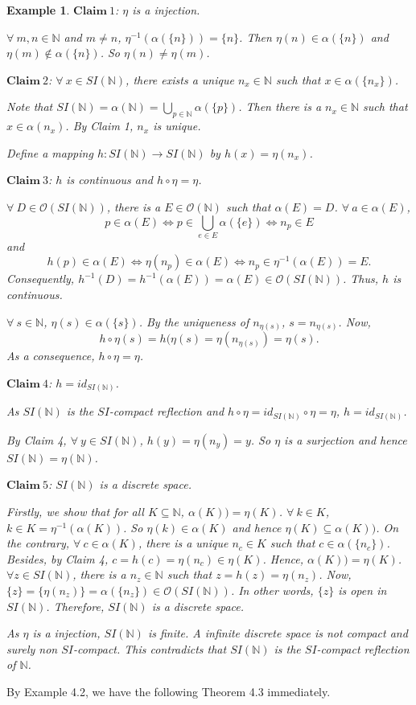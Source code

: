 \documentclass[preprint,12pt]{elsarticle}
\numberwithin{equation}{section}
\newtheorem{example}[theorem]{Example}
\begin{document}
\begin{example}
{$\mathbf{Claim} \ 1$: $\eta$ is a injection.

$\forall\ m,n\in\mathbb{\mathbb{N}}$ and $m\neq n$, $\eta^{-1}(\alpha(\{n\}))=\{n\}$. Then $\eta(n)\in\alpha(\{n\})$ and $\eta(m)\not\in\alpha(\{n\})$. So $\eta(n)\neq\eta(m)$.

$\mathbf{Claim} \ 2$: $\forall\ x\in SI(\mathbb{N})$, there exists a unique $n_{x}\in\mathbb{N}$ such that $x\in\alpha(\{n_{x}\})$.

Note that $SI(\mathbb{N})=\alpha(\mathbb{N})=\bigcup\limits_{p\in\mathbb{N}}\alpha(\{p\})$. Then there is a $n_{x}\in\mathbb{N}$ such that $x\in\alpha(n_{x})$. By Claim 1, $n_{x}$ is unique.

Define a mapping $h:SI(\mathbb{N})\longrightarrow SI(\mathbb{N})$ by $h(x)=\eta(n_{x})$.

$\mathbf{Claim} \ 3$: $h$ is continuous and $h\circ\eta=\eta$.

$\forall\ D\in\mathcal{O}(SI(\mathbb{N}))$, there is a $E\in\mathcal{O}(\mathbb{N})$ such that $\alpha(E)=D$. $\forall\ a\in\alpha(E)$,
$$p\in\alpha(E)\Longleftrightarrow p\in\bigcup\limits_{e\in E}\alpha(\{e\})\Longleftrightarrow n_{p}\in E$$ and
$$h(p)\in\alpha(E)\Longleftrightarrow\eta(n_{p})\in\alpha(E)\Longleftrightarrow n_{p}\in\eta^{-1}(\alpha(E))=E.$$ Consequently, $h^{-1}(D)=h^{-1}(\alpha(E))=\alpha(E)\in\mathcal{O}(SI(\mathbb{N}))$. Thus, $h$ is continuous.

$\forall\ s\in\mathbb{N}$, $\eta(s)\in\alpha(\{s\})$. By the uniqueness of $n_{\eta(s)}$, $s=n_{\eta(s)}$. Now, $$h\circ\eta(s)=h(\eta(s)=\eta(n_{\eta(s)})=\eta(s).$$ As a consequence, $h\circ\eta=\eta$.

$\mathbf{Claim} \ 4$: $h=id_{SI(\mathbb{N})}$.

As $SI(\mathbb{N})$ is the $SI$-compact reflection and $h\circ\eta=id_{SI(\mathbb{N})}\circ\eta=\eta$, $h=id_{SI(\mathbb{N})}$.

By Claim 4, $\forall\ y\in SI(\mathbb{N})$, $h(y)=\eta(n_{y})=y$. So $\eta$ is a surjection and hence $SI(\mathbb{N})=\eta(\mathbb{N})$.

$\mathbf{Claim} \ 5$: $SI(\mathbb{N})$ is a discrete space.

Firstly, we show that for all $K\subseteq\mathbb{N}$, $\alpha(K))=\eta(K)$. $\forall\ k\in K$, $k\in K=\eta^{-1}(\alpha(K))$. So $\eta(k)\in\alpha(K)$ and hence $\eta(K)\subseteq\alpha(K))$.
On the contrary, $\forall\ c\in\alpha(K)$, there is a unique $n_{c}\in K$ such that $c\in\alpha(\{n_{c}\})$. Besides, by Claim 4, $c=h(c)=\eta(n_{c})\in\eta(K)$. Hence, $\alpha(K))=\eta(K)$. $\forall z\in SI(\mathbb{N})$, there is a $n_{z}\in\mathbb{N}$ such that $z=h(z)=\eta(n_{z})$. Now, $\{z\}=\{\eta(n_{z})\}=\alpha(\{n_{z}\})\in\mathcal{O}(SI(\mathbb{N}))$. In other words, $\{z\}$ is open in $SI(\mathbb{N})$. Therefore, $SI(\mathbb{N})$ is a discrete space.

As $\eta$ is a injection, $SI(\mathbb{N})$ is finite. A infinite discrete space is not compact and surely non $SI$-compact. This contradicts that $SI(\mathbb{N})$ is the $SI$-compact reflection of $\mathbb{N}$.}
\end{example}
By Example 4.2, we have the following Theorem 4.3 immediately.
\end{document}
